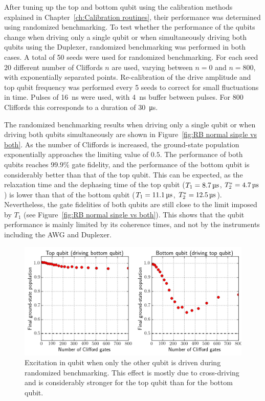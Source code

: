         After tuning up the top and bottom qubit using the calibration methods explained in Chapter~\ref{ch:Calibration routines}, their performance was determined using randomized benchmarking. To test whether the performance of the qubits change when driving only a single qubit or when simultaneously driving both qubits using the Duplexer, randomized benchmarking was performed in both cases. A total of 50 seeds were used for randomized benchmarking. For each seed $20$ different number of Cliffords $n$ are used, varying between $n=0$ and $n=800$, with exponentially separated points. Re-calibration of the drive amplitude and top qubit frequency was performed every 5 seeds to correct for small fluctuations in time. Pulses of \SI{16}{\nano \second} were used, with \SI{4}{\nano \second} buffer between pulses. For $800$ Cliffords this corresponds to a duration of \SI{30}{\micro \second}.

        The randomized benchmarking results when driving only a single qubit or when driving both qubits simultaneously are shown in Figure~\ref{fig:RB normal single vs both}. As the number of Cliffords is increased, the ground-state population exponentially approaches the limiting value of $0.5$. The performance of both qubits reaches $99.9\%$ gate fidelity, and the performance of the bottom qubit is considerably better than that of the top qubit.  This can be expected, as the relaxation time and the dephasing time of the top qubit ($T_1 = \text{\ensuremath{\SI{8.7}{\micro \second}}}$, $T_2^*=\text{\ensuremath{\SI{4.7}{\micro \second}}}$) is lower than that of the bottom qubit ($T_1 = \text{\ensuremath{\SI{11.1}{\micro \second}}}$, $T_2^*=\text{\ensuremath{\SI{12.5}{\micro \second}}}$). Nevertheless, the gate fidelities of both qubits are still close to the limit imposed by $T_1$ (see Figure~\ref{fig:RB normal single vs both}). This shows that the qubit performance is mainly limited by its coherence times, and not by the instruments including the AWG and Duplexer.

        \begin{figure}[tb]
          \centering
          \includegraphics[width=\textwidth]{../Figures/Randomized benchmarking/RB_normal_cross-driving.png}
          \caption{Excitation in qubit when only the other qubit is driven during randomized benchmarking. This effect is mostly due to cross-driving and is considerably stronger for the top qubit than for the bottom qubit.}
          \label{fig:RB normal cross-driving}
        \end{figure}

